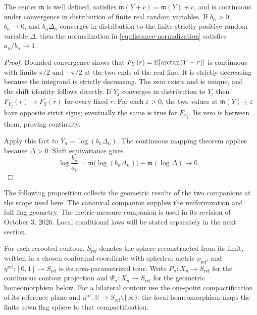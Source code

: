 \begin{lemma}\label{lem:space-normalization}
The center \(\mathfrak m\) is well defined, satisfies
\(\mathfrak m(Y+c)=\mathfrak m(Y)+c\), and is continuous under convergence
in distribution of finite real random variables.  If \(b_n>0\), \(b_n\to0\),
and \(b_n\Delta_n\) converges in distribution to the finite strictly positive
random variable \(\Delta\), then the normalization in
\eqref{eq:distance-normalization} satisfies \(a_n/b_n\to1\).
\end{lemma}

\begin{proof}
Bounded convergence shows that
\(F_Y(r)=\mathbb E[\arctan(Y-r)]\) is continuous with limits
\(\pi/2\) and \(-\pi/2\) at the two ends of the real line.  It is strictly
decreasing because the integrand is strictly decreasing.  The zero exists
and is unique, and the shift identity follows directly.  If \(Y_j\) converges
in distribution to \(Y\), then \(F_{Y_j}(r)\to F_Y(r)\) for every fixed \(r\).
For each \(\varepsilon>0\), the two values at
\(\mathfrak m(Y)\pm\varepsilon\) have opposite strict signs; eventually the
same is true for \(F_{Y_j}\).  Its zero is between them, proving continuity.

Apply this fact to \(Y_n=\log(b_n\Delta_n)\).  The continuous mapping theorem
applies because \(\Delta>0\).  Shift equivariance gives
\[
 \log\frac{b_n}{a_n}
 =\mathfrak m\bigl(\log(b_n\Delta_n)\bigr)-\mathfrak m(\log\Delta)
 \longrightarrow0.
\]
\end{proof}

The following proposition collects the geometric results of the two
companions at the scope used here.  The canonical companion supplies the
uniformization and full flag geometry.  The metric-measure companion is used
in its revision of October 3, 2026.  Local conditional laws will be stated
separately in the next section.

For each rerooted contour, \(S_{\mathrm{ref}}\) denotes the sphere
reconstructed from its limit, written in a chosen conformal coordinate
with spherical metric \(\rho_{\mathrm{ref}}\), and
\(\eta^{\mathrm{ref}}:[0,1]\to S_{\mathrm{ref}}\) is its
area-parametrized tour.  Write \(P_n:X_n\to S_{\mathrm{ref}}\) for the
continuous contour projection and \(\Psi_n:X_n\to S_{\mathrm{ref}}\)
for the geometric homeomorphism below.  For a bilateral contour use the
one-point compactification of its reference plane and
\(\eta^{\mathrm{ref}}:\mathbb R\to
S_{\mathrm{ref}}\setminus\{\infty\}\); the local homeomorphism maps
the finite sewn flag sphere to that compactification.

